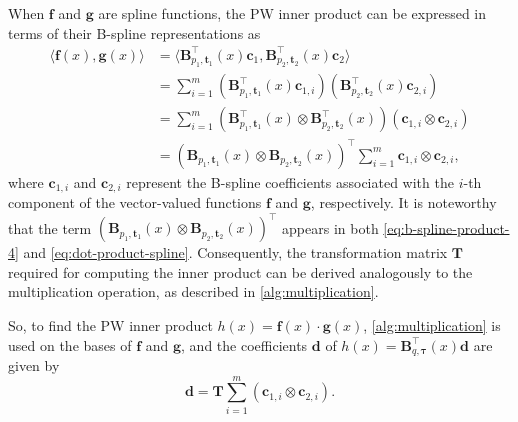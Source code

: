 When $\mathbf f$ and $\mathbf g$ are spline functions, the PW inner product can be expressed in terms of their B-spline representations as
\begin{equation}
    \label{eq:dot-product-spline}
    \begin{aligned}
        \langle\mathbf f(x), \mathbf g(x)\rangle &= \langle\mathbf B_{p_1, \mathbf t_1}^\top(x) \mathbf c_1, \mathbf B_{p_2, \mathbf t_2}^\top(x) \mathbf c_2\rangle \\
        &= \sum_{i=1}^m \left(\mathbf B_{p_1, \mathbf t_1}^\top(x) \mathbf c_{1,i}\right) \left(\mathbf B_{p_2, \mathbf t_2}^\top(x) \mathbf c_{2,i}\right) \\
        &= \sum_{i=1}^m \left(\mathbf B_{p_1, \mathbf t_1}^\top(x) \otimes \mathbf B_{p_2, \mathbf t_2}^\top(x)\right) \left(\mathbf c_{1,i} \otimes \mathbf c_{2,i}\right) \\
        &= \left(\mathbf B_{p_1, \mathbf t_1}(x) \otimes \mathbf B_{p_2, \mathbf t_2}(x)\right)^{\top} \sum_{i=1}^m \mathbf c_{1,i} \otimes \mathbf c_{2,i},
    \end{aligned}
\end{equation}
where $\mathbf c_{1,i}$ and $\mathbf c_{2,i}$ represent the B-spline coefficients associated with the $i$-th component of the vector-valued functions $\mathbf f$ and $\mathbf g$, respectively. It is noteworthy that the term $\left(\mathbf B_{p_1, \mathbf t_1}(x) \otimes \mathbf B_{p_2, \mathbf t_2}(x)\right)^{\top}$ appears in both \cref{eq:b-spline-product-4} and \cref{eq:dot-product-spline}. Consequently, the transformation matrix $\mathbf T$ required for computing the inner product can be derived analogously to the multiplication operation, as described in \cref{alg:multiplication}.

So, to find the PW inner product $h(x) = \mathbf f(x) \cdot \mathbf g(x)$, \cref{alg:multiplication} is used on the bases of $\mathbf f$ and $\mathbf g$, and the coefficients $\mathbf d$ of $h(x) = \mathbf B_{q, \boldsymbol{\tau}}^\top(x) \mathbf d$ are given by
\begin{equation}
    \mathbf d = \mathbf T \sum_{i=1}^m (\mathbf c_{1,i} \otimes \mathbf c_{2,i}).
\end{equation}


